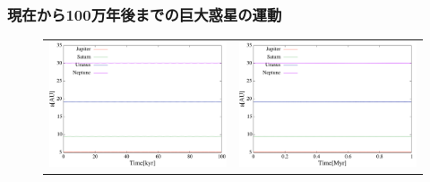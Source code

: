\documentclass[11pt,a4paper,oneside,onecolumn]{jarticle}
\begin{document}
\subsubsection{現在から100万年後までの巨大惑星の運動}


\begin{figure}[H]
\begin{tabular}{cc}
\begin{minipage}[t]{0.45\hsize}
\centering
\includegraphics[width=7.6cm]{./image/Nomove_a_100kyr.pdf}
\end{minipage} &
\begin{minipage}[t]{0.45\hsize}
\centering
\includegraphics[width=7.6cm]{./image/Nomove_a_1Myr.pdf}
\end{minipage}
%
\end{tabular}
\caption{\label{}}
\end{figure}
\end{document}
